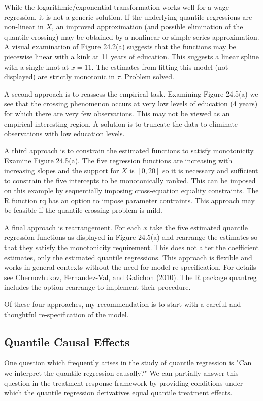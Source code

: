 \documentclass[10pt]{article}
\begin{document}
While the logarithmic/exponential transformation works well for a wage regression, it is not a generic solution. If the underlying quantile regressions are non-linear in $X$, an improved approximation (and possible elimination of the quantile crossing) may be obtained by a nonlinear or simple series approximation. A visual examination of Figure 24.2(a) suggests that the functions may be piecewise linear with a kink at 11 years of education. This suggests a linear spline with a single knot at $x=11$. The estimates from fitting this model (not displayed) are strictly monotonic in $\tau$. Problem solved.

A second approach is to reassess the empirical task. Examining Figure 24.5(a) we see that the crossing phenomenon occurs at very low levels of education (4 years) for which there are very few observations. This may not be viewed as an empirical interesting region. A solution is to truncate the data to eliminate observations with low education levels.

A third approach is to constrain the estimated functions to satisfy monotonicity. Examine Figure 24.5(a). The five regression functions are increasing with increasing slopes and the support for $X$ is $[0,20]$ so it is necessary and sufficient to constrain the five intercepts to be monotonically ranked. This can be imposed on this example by sequentially imposing cross-equation equality constraints. The R function rq has an option to impose parameter contraints. This approach may be feasible if the quantile crossing problem is mild.

A final approach is rearrangement. For each $x$ take the five estimated quantile regression functions as displayed in Figure 24.5(a) and rearrange the estimates so that they satisfy the monotonicity requirement. This does not alter the coefficient estimates, only the estimated quantile regressions. This approach is flexible and works in general contexts without the need for model re-specification. For details see Chernozhukov, Fernandez-Val, and Galichon (2010). The R package quantreg includes the option rearrange to implement their procedure.

Of these four approaches, my recommendation is to start with a careful and thoughtful re-specification of the model.

\subsection{Quantile Causal Effects}
One question which frequently arises in the study of quantile regression is "Can we interpret the quantile regression causally?" We can partially answer this question in the treatment response framework by providing conditions under which the quantile regression derivatives equal quantile treatment effects.
\end{document}
